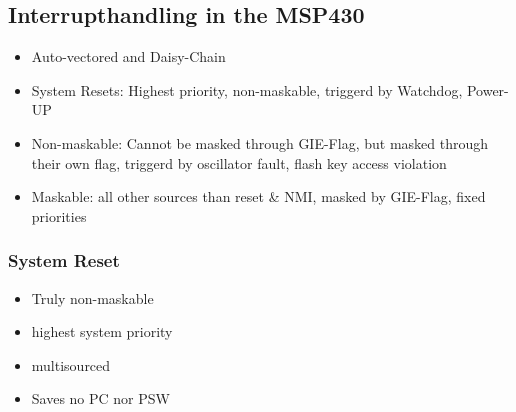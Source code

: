 \subsection{Interrupthandling in the MSP430 }
\begin{itemize}
    \item Auto-vectored and Daisy-Chain
    \item System Resets: Highest priority, non-maskable, triggerd by Watchdog, Power-UP
    \item Non-maskable: Cannot be masked through GIE-Flag, but masked through their own flag, triggerd by oscillator fault, flash key access violation
    \item Maskable: all other sources than reset \& NMI, masked by GIE-Flag, fixed priorities
\end{itemize}
\subsubsection{System Reset }
\begin{multicols}{2}
    \begin{itemize}
        \item Truly non-maskable
        \item highest system priority
        \item multisourced
        \item Saves no PC nor PSW
    \end{itemize}
\end{multicols}

